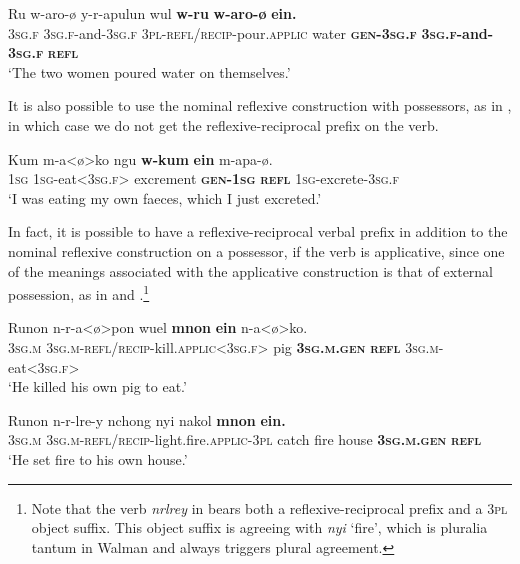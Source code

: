 \documentclass[output=paper]{langscibook}
\begin{document}
 

\ea%
    \label{ex:Brown:50}
    \gll Ru  w-aro-ø  y-r-apulun  wul  \textbf{w-ru} \textbf{w-aro-ø}  \textbf{ein.}\\
 \textsc{3sg.f}  \textsc{3sg.f}{}-and-\textsc{3sg.f}  \textsc{3pl-refl/recip}{}-pour.\textsc{applic}  water  \textbf{\textsc{gen}}\textbf{{}-}\textbf{\textsc{3sg.f}}
        \textbf{\textsc{3sg.f}}\textbf{{}-and-}\textbf{\textsc{3sg.f}}  \textbf{\textsc{refl}} \\
    \glt ‘The two women poured water on themselves.’
    \z



  It is also possible to use the nominal reflexive construction with possessors, as in , in which case we do not get the reflexive-reciprocal prefix on the verb.


\ea%
    \label{ex:Brown:51}
    \gll Kum  m-a<ø>ko  ngu  \textbf{w-kum}  \textbf{ein}  m-apa-ø.\\
    \textsc{1sg}  \textsc{1sg}{}-eat<\textsc{3sg.f}>  excrement  \textbf{\textsc{gen}}\textbf{{}-}\textbf{\textsc{1sg}}  \textbf{\textsc{refl}}  \textsc{1sg}{}-excrete-\textsc{3sg.f}\\
    \glt ‘I was eating my own faeces, which I just excreted.’
    \z 

   
In fact, it is possible to have a reflexive-reciprocal verbal prefix in addition to the nominal reflexive construction on a possessor, if the verb is applicative, since one of the meanings associated with the applicative construction is that of external possession, as in  and .\footnote{ Note that the verb \emph{nrlrey} in  bears both a reflexive-reciprocal prefix and a \textsc{3pl} object suffix. This object suffix is agreeing with \emph{nyi} ‘fire’, which is pluralia tantum in Walman and always triggers plural agreement.}








\ea%
    \label{ex:Brown:52}
    \gll Runon  n-r-a<ø>pon  wuel  \textbf{mnon} \textbf{ein}  n-a<ø>ko.\\
 \textsc{3sg.m}  \textsc{3sg.m-refl/recip-}kill\textsc{.applic<3sg.f>}  pig  \textbf{\textsc{3sg.m.gen}} \textbf{\textsc{refl}}  \textsc{3sg.m}{}-eat<\textsc{3sg.f}>\\
    \glt ‘He killed his own pig to eat.’
    \z


 

\ea%
    \label{ex:Brown:53}
    \gll Runon  n-r-lre-y  nchong  nyi  nakol \textbf{mnon}  \textbf{ein.}\\
 \textsc{3sg.m}  \textsc{3sg.m-refl/recip-}light.fire\textsc{.applic-3pl}  catch  fire  house \textbf{\textsc{3sg.m.gen}}  \textbf{\textsc{refl}}\\
    \glt ‘He set fire to his own house.’
    \z
\end{document}
